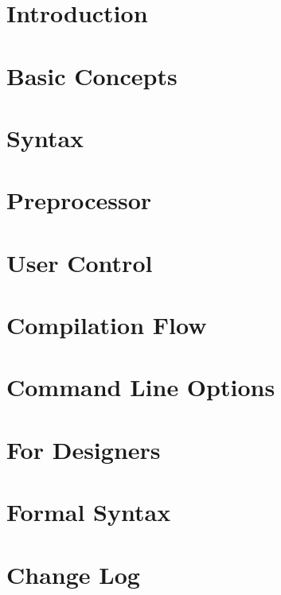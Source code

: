 \documentclass[10pt,oneside]{book}
\begin{document}

\frontmatter
\tableofcontents
\listoftables
\listoffigures
\lstlistoflistings
\mainmatter
\chapter{Introduction}\label{sec:intro}
\chapter{Basic Concepts}\label{sec:basic concepts}
\chapter{Syntax}\label{sec:syntax}
\chapter{Preprocessor}\label{sec:pp}
\chapter{User Control}\label{sec:user control}

\chapter{Compilation Flow}\label{sec:flow}
\chapter{Command Line Options}\label{sec:command line opt}
\chapter{For \vperl{} Designers}\label{sec:for vperl}

\appendix
\chapter{Formal Syntax}\label{sec:bnf}
\chapter{Change Log}
\printindex{} 
\end{document}
